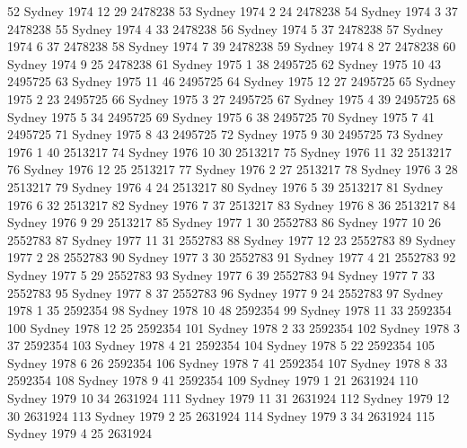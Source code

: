 \documentclass[a4paper]{article}                %
\begin{document}
\begin{Schunk}
\begin{Soutput}
52    Sydney  1974    12      29 2478238
53    Sydney  1974     2      24 2478238
54    Sydney  1974     3      37 2478238
55    Sydney  1974     4      33 2478238
56    Sydney  1974     5      37 2478238
57    Sydney  1974     6      37 2478238
58    Sydney  1974     7      39 2478238
59    Sydney  1974     8      27 2478238
60    Sydney  1974     9      25 2478238
61    Sydney  1975     1      38 2495725
62    Sydney  1975    10      43 2495725
63    Sydney  1975    11      46 2495725
64    Sydney  1975    12      27 2495725
65    Sydney  1975     2      23 2495725
66    Sydney  1975     3      27 2495725
67    Sydney  1975     4      39 2495725
68    Sydney  1975     5      34 2495725
69    Sydney  1975     6      38 2495725
70    Sydney  1975     7      41 2495725
71    Sydney  1975     8      43 2495725
72    Sydney  1975     9      30 2495725
73    Sydney  1976     1      40 2513217
74    Sydney  1976    10      30 2513217
75    Sydney  1976    11      32 2513217
76    Sydney  1976    12      25 2513217
77    Sydney  1976     2      27 2513217
78    Sydney  1976     3      28 2513217
79    Sydney  1976     4      24 2513217
80    Sydney  1976     5      39 2513217
81    Sydney  1976     6      32 2513217
82    Sydney  1976     7      37 2513217
83    Sydney  1976     8      36 2513217
84    Sydney  1976     9      29 2513217
85    Sydney  1977     1      30 2552783
86    Sydney  1977    10      26 2552783
87    Sydney  1977    11      31 2552783
88    Sydney  1977    12      23 2552783
89    Sydney  1977     2      28 2552783
90    Sydney  1977     3      30 2552783
91    Sydney  1977     4      21 2552783
92    Sydney  1977     5      29 2552783
93    Sydney  1977     6      39 2552783
94    Sydney  1977     7      33 2552783
95    Sydney  1977     8      37 2552783
96    Sydney  1977     9      24 2552783
97    Sydney  1978     1      35 2592354
98    Sydney  1978    10      48 2592354
99    Sydney  1978    11      33 2592354
100   Sydney  1978    12      25 2592354
101   Sydney  1978     2      33 2592354
102   Sydney  1978     3      37 2592354
103   Sydney  1978     4      21 2592354
104   Sydney  1978     5      22 2592354
105   Sydney  1978     6      26 2592354
106   Sydney  1978     7      41 2592354
107   Sydney  1978     8      33 2592354
108   Sydney  1978     9      41 2592354
109   Sydney  1979     1      21 2631924
110   Sydney  1979    10      34 2631924
111   Sydney  1979    11      31 2631924
112   Sydney  1979    12      30 2631924
113   Sydney  1979     2      25 2631924
114   Sydney  1979     3      34 2631924
115   Sydney  1979     4      25 2631924

\end{Soutput}
\end{Schunk}
\end{document}

